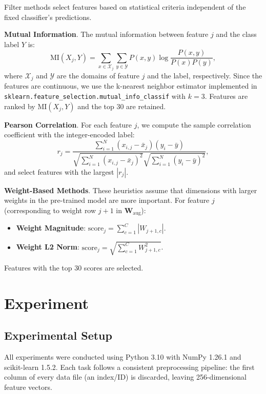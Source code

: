 \documentclass[onecolumn,a4paper,12pt]{IEEEtran}
\begin{document}
Filter methods select features based on statistical criteria independent of the fixed classifier's predictions.

\textbf{Mutual Information}. The mutual information between feature $j$ and the class label $Y$ is:
\begin{equation}
\text{MI}(X_j, Y) = \sum_{x \in \mathcal{X}_j} \sum_{y \in \mathcal{Y}} P(x, y) \log \frac{P(x, y)}{P(x) P(y)},
\end{equation}
where $\mathcal{X}_j$ and $\mathcal{Y}$ are the domains of feature $j$ and the label, respectively. Since the features are continuous, we use the k-nearest neighbor estimator implemented in \texttt{sklearn.feature\_selection.mutual\_info\_classif} with $k=3$. Features are ranked by $\text{MI}(X_j, Y)$ and the top 30 are retained.

\textbf{Pearson Correlation}. For each feature $j$, we compute the sample correlation coefficient with the integer-encoded label:
\begin{equation}
r_j = \frac{\sum_{i=1}^{N} (x_{i,j} - \bar{x}_j)(y_i - \bar{y})}{\sqrt{\sum_{i=1}^{N} (x_{i,j} - \bar{x}_j)^2} \sqrt{\sum_{i=1}^{N} (y_i - \bar{y})^2}},
\end{equation}
and select features with the largest $|r_j|$.

\textbf{Weight-Based Methods}. These heuristics assume that dimensions with larger weights in the pre-trained model are more important. For feature $j$ (corresponding to weight row $j+1$ in $\mathbf{W}_{\text{aug}}$):
\begin{itemize}
    \item \textbf{Weight Magnitude}: $\text{score}_j = \sum_{c=1}^{C} |W_{j+1, c}|$.
    \item \textbf{Weight L2 Norm}: $\text{score}_j = \sqrt{\sum_{c=1}^{C} W_{j+1, c}^2}$.
\end{itemize}
Features with the top 30 scores are selected.

\section{Experiment}
\label{sec:experiment}

\subsection{Experimental Setup}

All experiments were conducted using Python 3.10 with NumPy 1.26.1 and scikit-learn 1.5.2. Each task follows a consistent preprocessing pipeline: the first column of every data file (an index/ID) is discarded, leaving 256-dimensional feature vectors.
\end{document}
